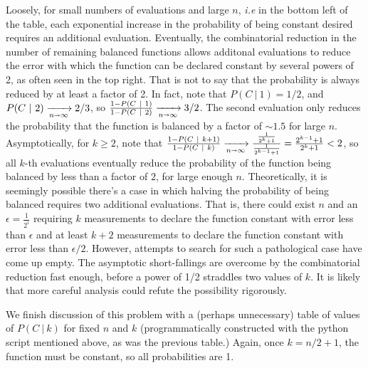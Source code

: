 Loosely, for small numbers of evaluations and large $n$, \textit{i.e} in the bottom left of the table, each exponential increase in the probability of being constant desired requires an additional evaluation.  Eventually, the combinatorial reduction in the number of remaining balanced functions allows additonal evaluations to reduce the error with which the function can be declared constant by several powers of 2, as often seen in the top right.  That is not to say that the probability is always reduced by at least a factor of 2.  In fact, note that $P(C\ |\ 1) = 1/2$, and $P(C\ |\ 2)\xrightarrow[n\shortrightarrow\infty]{}2/3$, so $\frac{1-P(C\ |\ 1)}{1-P(C\ |\ 2)}\xrightarrow[n\shortrightarrow\infty]{}3/2$. The second evaluation only reduces the probability that the function is balanced by a factor of ${\sim}1.5$ for large $n$.  Asymptotically, for $k\geq2$, note that $\frac{1-P(C\ |\ k+1)}{1-P(C\ |\ k)}\xrightarrow[n\shortrightarrow\infty]{}\frac{\frac{1}{2^k+1}}{\frac{1}{2^{k-1}+1}}=\frac{2^{k-1}+1}{2^k+1}<2$, so all $k$-th evaluations eventually reduce the probability of the function being balanced by less than a factor of $2$, for large enough $n$.  Theoretically, it is seemingly possible there's a case in which halving the probability of being balanced requires two additional evaluations.  That is, there could exist $n$ and an $\epsilon=\frac{1}{2^i}$ requiring $k$ measurements to declare the function constant with error less than $\epsilon$ and at least $k+2$ measurements to declare the function constant with error less than $\epsilon/2$.  However, attempts to search for such a pathological case have come up empty.  The asymptotic short-fallings are overcome by the combinatorial reduction fast enough, before a power of 1/2 straddles two values of $k$. It is likely that more careful analysis could refute the possibility rigorously.

We finish discussion of this problem with a (perhaps unnecessary) table of values of $P(C\ |\ k)$ for fixed $n$ and $k$ (programmatically constructed with the python script mentioned above, as was the previous table.)  Again, once $k=n/2+1$, the function must be constant, so all probabilities are 1.

